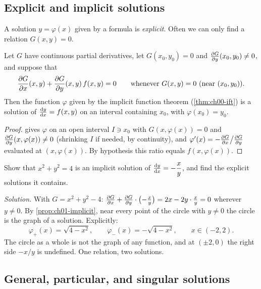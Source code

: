 \subsection{Explicit and implicit solutions}

A solution $y = \varphi(x)$ given by a formula is \emph{explicit}. Often we
can only find a relation $G(x,y) = 0$.

\begin{proposition}\label{prop:ch01-implicit}
Let $G$ have continuous partial derivatives, let $G(x_0,y_0) = 0$ and
$\frac{\partial G}{\partial y}(x_0,y_0)\neq 0$, and suppose that
\[
  \frac{\partial G}{\partial x}(x,y) + \frac{\partial G}{\partial y}(x,y)\,f(x,y) = 0
  \qquad\text{whenever } G(x,y) = 0 \text{ (near $(x_0,y_0)$)}.
\]
Then the function $\varphi$ given by the implicit function theorem
(\cref{thm:ch00-ift}) is a solution of $\frac{\mathrm{d}y}{\mathrm{d}x} = f(x,y)$ on an interval
containing $x_0$, with $\varphi(x_0) = y_0$.
\end{proposition}
\begin{proof}
 gives $\varphi$ on an open interval $I\ni x_0$ with
$G(x,\varphi(x)) = 0$ and $\frac{\partial G}{\partial y}(x,\varphi(x))\neq 0$ (shrinking $I$ if
needed, by continuity), and
$\varphi'(x) = -\frac{\partial G}{\partial x}\big/\frac{\partial G}{\partial y}$ evaluated at $(x,\varphi(x))$. By
hypothesis this ratio equals $f(x,\varphi(x))$.
\end{proof}

\begin{example}\label{ex:ch01-circle}
Show that $x^2 + y^2 = 4$ is an implicit solution of $\frac{\mathrm{d}y}{\mathrm{d}x} = -\dfrac{x}{y}$,
and find the explicit solutions it contains.

\emph{Solution.} With $G = x^2 + y^2 - 4$: $\frac{\partial G}{\partial x} + \frac{\partial G}{\partial y}\cdot\bigl(-\tfrac{x}{y}\bigr)
= 2x - 2y\cdot\tfrac{x}{y} = 0$ wherever $y\neq 0$. By
\cref{prop:ch01-implicit}, near every point of the circle with $y\neq 0$ the
circle is the graph of a solution. Explicitly:
\[
  \varphi_+(x) = \sqrt{4 - x^2},\qquad \varphi_-(x) = -\sqrt{4-x^2},
  \qquad x\in(-2,2).
\]
The circle as a whole is not the graph of any function, and at $(\pm 2, 0)$ the
right side $-x/y$ is undefined. One relation, two solutions.
\end{example}

\subsection{General, particular, and singular solutions}

